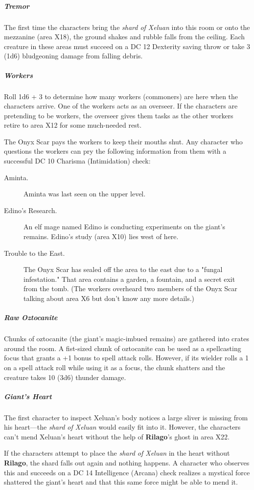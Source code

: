 \documentclass[10pt,a4paper,twoside,bg=print,twocolumn,openany,nodeprecatedcode]{dndbook}
\begin{document}
\subparagraph{Tremor}
The first time the characters bring the \textit{shard of Xeluan} into this room or onto the mezzanine (area X18), the ground shakes and rubble falls from the ceiling. Each creature in these areas must succeed on a DC 12 Dexterity saving throw or take 3 (1d6) bludgeoning damage from falling debris.

\subparagraph{Workers}
Roll 1d6 + 3 to determine how many workers (commoners) are here when the characters arrive. One of the workers acts as an overseer. If the characters are pretending to be workers, the overseer gives them tasks as the other workers retire to area X12 for some much-needed rest.

The Onyx Scar pays the workers to keep their mouths shut. Any character who questions the workers can pry the following information from them with a successful DC 10 Charisma (Intimidation) check:


\begin{description}
\item[Aminta.]
Aminta was last seen on the upper level.
\item[Edino's Research.]
An elf mage named Edino is conducting experiments on the giant's remains. Edino's study (area X10) lies west of here.
\item[Trouble to the East.]
The Onyx Scar has sealed off the area to the east due to a "fungal infestation." That area contains a garden, a fountain, and a secret exit from the tomb. (The workers overheard two members of the Onyx Scar talking about area X6 but don't know any more details.)
\end{description}

\subparagraph{Raw Oztocanite}
Chunks of oztocanite (the giant's magic-imbued remains) are gathered into crates around the room. A fist-sized chunk of oztocanite can be used as a spellcasting focus that grants a +1 bonus to spell attack rolls. However, if its wielder rolls a 1 on a spell attack roll while using it as a focus, the chunk shatters and the creature takes 10 (3d6) thunder damage.

\subparagraph{Giant's Heart}
The first character to inspect Xeluan's body notices a large sliver is missing from his heart—the \textit{shard of Xeluan} would easily fit into it. However, the characters can't mend Xeluan's heart without the help of \textbf{Rilago}'s ghost in area X22.

If the characters attempt to place the \textit{shard of Xeluan} in the heart without \textbf{Rilago}, the shard falls out again and nothing happens. A character who observes this and succeeds on a DC 14 Intelligence (Arcana) check realizes a mystical force shattered the giant's heart and that this same force might be able to mend it.
\end{document}
